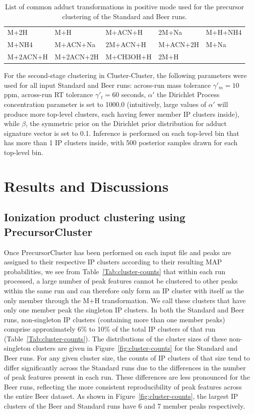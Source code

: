 \begin{table}[!htbp]
\caption{List of common adduct transformations in positive mode used for the precursor clustering of the Standard and Beer runs.\label{Tab:transformation}}{\begin{tabular}{@{}lllll@{}}
M+2H & M+H & M+ACN+H & 2M+Na & M+H+NH4\\
M+NH4 & M+ACN+Na & 2M+ACN+H & M+ACN+2H & M+Na\\
M+2ACN+H & M+2ACN+2H & M+CH3OH+H & 2M+H
\end{tabular}}{}
\end{table}

For the second-stage clustering in Cluster-Cluster, the following parameters were used for all input Standard and Beer runs: across-run mass tolerance $\gamma'_m=10$ ppm, across-run RT tolerance $\gamma'_t=60$ seconds, $\alpha'$ the Dirichlet Process concentration parameter is set to 1000.0 (intuitively, large values of $\alpha'$ will produce more top-level clusters, each having fewer member IP clusters inside), while $\beta$, the symmetric prior on the Dirichlet prior distribution for adduct signature vector is set to 0.1. Inference is performed on each top-level bin that has more than 1 IP clusters inside, with 500 posterior samples drawn for each top-level bin.

\section{Results and Discussions}

\subsection{Ionization product clustering using PrecursorCluster}

Once PrecursorCluster has been performed on each input file and peaks are assigned to their respective IP clusters according to their resulting MAP probabilities, we see from Table~\ref{Tab:cluster-counts} that within each run processed, a large number of peak features cannot be clustered to other peaks within the same run and can therefore only form an IP cluster with itself as the only member through the M+H transformation. We call these clusters that have only one member peak the singleton IP clusters. In both the Standard and Beer runs, non-singleton IP clusters (containing more than one member peaks) comprise approximately 6\% to 10\% of the total IP clusters of that run (Table~\ref{Tab:cluster-counts}). The distributions of the cluster sizes of these non-singleton clusters are given in Figure~\ref{fig:cluster-counts} for the Standard and Beer runs. For any given cluster size, the counts of IP clusters of that size tend to differ significantly across the Standard runs due to the differences in the number of peak features present in each run. These differences are less pronounced for the Beer runs, reflecting the more consistent reproducibility of peak features across the entire Beer dataset. As shown in Figure~\ref{fig:cluster-counts}, the largest IP clusters of the Beer and Standard runs have 6 and 7 member peaks respectively. 

